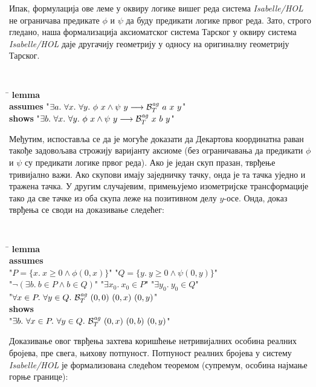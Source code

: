 Ипак, формулација ове леме у оквиру логике вишег реда система
\emph{Isabelle/HOL} не ограничава предикате $\phi$ и $\psi$ да буду
предикати логике првог реда. Зато, строго гледано, наша формализација
аксиоматског система Тарског у оквиру система \emph{Isabelle/HOL} даје
другачију геометрију у односу на оригиналну геометрију Тарског.
 {\tt
\begin{tabbing}
\hspace{5mm}\=\kill
\textbf{lemma}\\
\>\textbf{assumes} "$\exists a.\ \forall x.\ \forall y.\ \phi\ x \wedge \psi\ y \longrightarrow \mathcal{B}_T^{\mathit{ag}}\ a\ x\ y$"\\
\>\textbf{shows} "$\exists b.\ \forall x.\ \forall y.\ \phi\ x \wedge \psi\ y \longrightarrow \mathcal{B}_T^{\mathit{ag}}\ x\ b\ y$"
\end{tabbing}
}
Међутим, испоставља се да је могуће доказати да Декартова координатна
раван такође задовољава строжију варијанту аксиоме (без ограничавања
да предикати $\phi$ и $\psi$ су предикати логике првог реда). Ако је
један скуп празан, тврђење тривијално важи. Ако скупови имају
заједничку тачку, онда је та тачка уједно и тражена тачка. У другим
случајевим, примењујемо изометријске трансформације тако да све тачке
из оба скупа леже на позитивном делу $y$-осе. Онда, доказ тврђења се
своди на доказивање следећег:
{\tt
\begin{tabbing}
\hspace{5mm}\=\kill
\textbf{lemma}\\
\>\textbf{assumes}\\
\>"$P = \{x.\ x\ge 0 \wedge \phi(0, x)\}$" "$Q = \{y.\ y\ge 0\wedge \psi(0, y)\}$"\\
\>"$\neg (\exists b.\ b \in P \wedge b \in Q)$" "$\exists x_0.\ x_0 \in P$" "$\exists y_0.\ y_0 \in Q$"\\
\>"$\forall x \in P.\ \forall y \in Q.\ \agbett{(0, 0)}{(0, x)}{(0, y)}$"\\
\>\textbf{shows}\\
\>"$\exists b.\ \forall x \in P.\ \forall y \in Q.\ \mathcal{B}_T^{\mathit{ag}}\ (0, x)\ (0, b)\ (0, y)$"
\end{tabbing}
}  Доказивање овог тврђења захтева коришћење
нетривијалних особина реалних бројева, пре свега, њихову
потпуност. Потпуност реалних бројева у систему \emph{Isabelle/HOL} је
формализована следећом теоремом (супремум, особина најмање горње
границе):

{\tt 
\begin{tabbing}
\hspace{15mm}\=\kill
\textbf{lemma} "$(\exists x.\ x \in P) \wedge (\exists y.\ \forall x\in P.\ x < y) \longrightarrow$} \\
\> $\exists S.\ (\forall y.\ (\exists x\in P.\ y < x) \leftrightarrow y < S)$"}
\end{tabbing}
}

